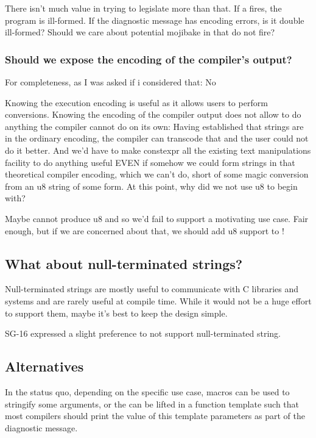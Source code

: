 \documentclass{wg21}
\begin{document}
There isn't much value in trying to legislate more than that.
If a  fires, the program is ill-formed. If the diagnostic message has encoding errors, is it double ill-formed?
Should we care about potential mojibake in  that do not fire?

\subsubsection{Should we expose the encoding of the compiler's output?}

For completeness, as I was asked if i considered that: No

Knowing the execution encoding is useful as it allows users to perform conversions.
Knowing the encoding of the compiler output does not allow to do anything the compiler cannot do on its own:
Having established that strings are in the ordinary encoding, the compiler can transcode that and the user could not do it better.
And we'd have to make constexpr all the existing text manipulations facility to do anything useful EVEN if somehow we could form strings in that
theoretical compiler encoding, which we can't do, short of some magic conversion from an u8 string of some form.
At this point, why did we not use u8 to begin with?

Maybe  cannot produce u8 and so we'd fail to support a motivating use case.
Fair enough, but if we are concerned about that, we should add u8 support to  !


\subsection{What about null-terminated strings?}

Null-terminated strings are mostly useful to communicate with C libraries and systems and are rarely useful at compile time.
While it would not be a huge effort to support them, maybe it's best to keep the design simple.

SG-16 expressed a slight preference to not support null-terminated string.

\subsection{Alternatives}

In the status quo, depending on the specific use case, macros can be used to stringify some arguments, or
the  can be lifted in a function template such that most compilers should print the value
of this template parameters as part of the diagnostic message.
\end{document}
